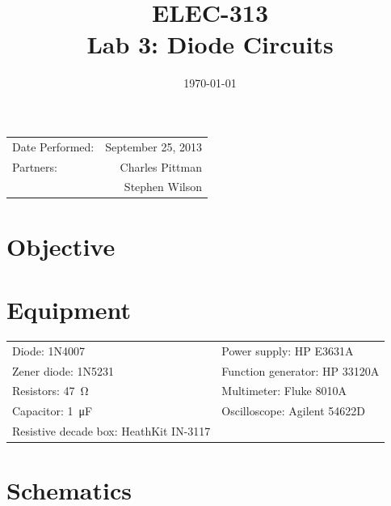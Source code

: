 \documentclass{article}
\author{}
\title{ELEC-313 \\ Lab 3: Diode Circuits\\ }
\date{\today}
\begin{document}
\maketitle

\begin{center}
  \begin{tabular}{lr}
    Date Performed: & September 25, 2013 \\
    Partners: & Charles Pittman \\
    & Stephen Wilson \\
  \end{tabular}
\end{center}

\newpage

\tableofcontents
\listoffigures
\listoftables

\newpage


\renewcommand{\labelenumi}{\alph{enumi}.}

\section{Objective}
\label{sec:objective}


\section{Equipment}
\label{sec:equipment}

\begin{tabular}{ll}
  \centering
  Diode: 1N4007 & Power supply: HP E3631A \\
  Zener diode: 1N5231 & Function generator: HP 33120A \\
  Resistors: \SI{47}{\ohm} & Multimeter: Fluke 8010A \\
  Capacitor: \SI{1}{\micro\farad} & Oscilloscope: Agilent 54622D \\
  Resistive decade box: HeathKit IN-3117 \\
\end{tabular}

\section{Schematics}
\label{sec:schematics}
\end{document}
